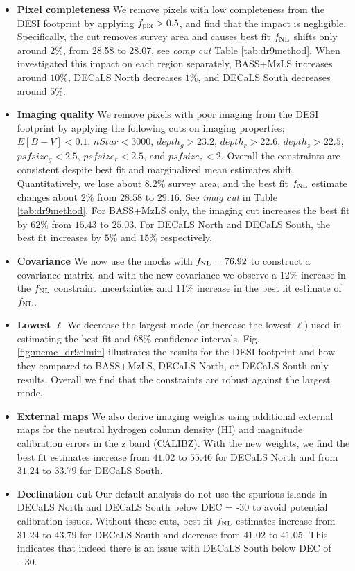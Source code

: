\begin{itemize}
\item \textbf{Pixel completeness}
We remove pixels with low completeness from the DESI footprint by applying $f_{\rm pix}>0.5$, and find that the impact is negligible. Specifically, the cut removes  survey area and causes best fit $f_{\rm NL}$ shifts only around $2\%$, from 28.58 to 28.07, see \textit{comp cut} Table \ref{tab:dr9method}. When investigated this impact on each region separately, BASS+MzLS increases around $10\%$, DECaLS North decreases $1\%$, and DECaLS South decreases around $5\%$.

\item \textbf{Imaging quality}
We remove pixels with poor imaging from the DESI footprint by applying the following cuts on imaging properties; $E[B-V]<0.1$, $nStar < 3000$, $depth_{g} > 23.2$, $depth_{r} > 22.6$, $depth_{z} > 22.5$, $psfsize_{g}<2.5$, $psfsize_{r}<2.5$, and $psfsize_{z}<2$. Overall the constraints are consistent despite best fit and marginalized mean estimates shift. Quantitatively, we lose about $8.2\%$ survey area, and the best fit $f_{\rm NL}$ estimate changes about $2\%$ from $28.58$ to $29.16$. See \textit{imag cut} in Table \ref{tab:dr9method}. For BASS+MzLS only, the imaging cut increases the best fit by $62\%$ from $15.43$ to $25.03$. For DECaLS North and DECaLS South, the best fit increases by $5\%$ and $15\%$ respectively.

\item \textbf{Covariance}
We now use the mocks with $f_{\rm NL}=76.92$ to construct a covariance matrix, and with the new covariance we observe a $12\%$ increase in the $f_{\rm NL}$ constraint uncertainties and $11\%$ increase in the best fit estimate of $f_{\rm NL}$.

\item \textbf{Lowest $\ell$} 
We decrease the largest mode (or increase the lowest $\ell$) used in estimating the best fit and $68\%$ confidence intervals. Fig. \ref{fig:mcmc_dr9elmin} illustrates the results for the DESI footprint and how they compared to BASS+MzLS, DECaLS North, or DECaLS South only results. Overall we find that the constraints are robust against the largest mode.

\item \textbf{External maps} We also derive imaging weights using additional external maps for the neutral hydrogen column density (HI) and magnitude calibration errors in the z band (CALIBZ). With the new weights, we find the best fit estimates increase from $41.02$ to $55.46$ for DECaLS North and from $31.24$ to $33.79$ for DECaLS South.

\item \textbf{Declination cut} Our default analysis do not use the spurious islands in DECaLS North and DECaLS South below DEC = -30 to avoid potential calibration issues.  Without these cuts, best fit $f_{\rm NL}$ estimates increase from $31.24$ to $43.79$ for DECaLS South and decrease from $41.02$ to $41.05$. This indicates that indeed there is an issue with DECaLS South below DEC of $-30$.

\end{itemize}

